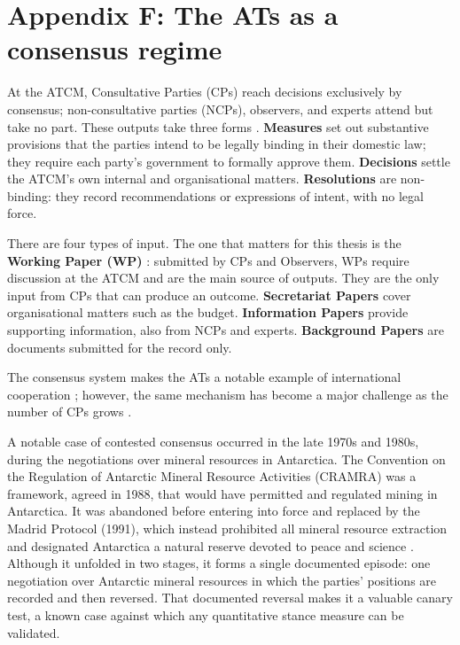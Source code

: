 \section*{Appendix F: The ATs as a consensus regime}
\label{app:f}

At the ATCM, Consultative Parties (CPs) reach decisions exclusively by consensus; non-consultative
parties (NCPs), observers, and experts attend but take no part. These outputs take three forms
\parencite[Rule~24]{ATS2023RoP}. \textbf{Measures} set out substantive provisions that the
parties intend to be legally binding in their domestic law; they require each party's government
to formally approve them. \textbf{Decisions} settle the ATCM's own internal and organisational
matters. \textbf{Resolutions} are non-binding: they record recommendations or expressions of
intent, with no legal force.

There are four types of input. The one that matters for this thesis is the \textbf{Working Paper
(WP)} \parencite[Rule~48]{ATS2023RoP}: submitted by CPs and Observers, WPs require discussion at
the ATCM and are the main source of outputs. They are the only input from CPs that can produce an
outcome. \textbf{Secretariat Papers} \parencite[Rule~49]{ATS2023RoP} cover organisational matters
such as the budget. \textbf{Information Papers} \parencite[Rule~50]{ATS2023RoP} provide
supporting information, also from NCPs and experts. \textbf{Background Papers}
\parencite[Rule~51]{ATS2023RoP} are documents submitted for the record only.

The consensus system makes the ATs a notable example of international cooperation
\parencite{jackson2021antarctica}; however, the same mechanism has become a major challenge as
the number of CPs grows \parencite{Tsebelis2002,Gardiner2025}.

A notable case of contested consensus occurred in the late 1970s and 1980s, during the
negotiations over mineral resources in Antarctica. The Convention on the Regulation of Antarctic
Mineral Resource Activities (CRAMRA) was a framework, agreed in 1988, that would have permitted
and regulated mining in Antarctica. It was abandoned before entering into force and replaced by
the Madrid Protocol (1991), which instead prohibited all mineral resource extraction and
designated Antarctica a natural reserve devoted to peace and science
\parencite{jackson2021antarctica}. Although it unfolded in two stages, it forms a single
documented episode: one negotiation over Antarctic mineral resources in which the parties'
positions are recorded and then reversed. That documented reversal makes it a valuable canary
test, a known case against which any quantitative stance measure can be validated.

